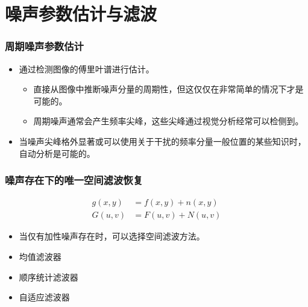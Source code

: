 \documentclass{beamer}
\begin{document}
\section{噪声参数估计与滤波}
\label{sec-4}
\begin{frame}
\frametitle{周期噪声参数估计}
\label{sec-4-1}

\begin{itemize}
\item 通过检测图像的傅里叶谱进行估计。
\begin{itemize}
\item 直接从图像中推断噪声分量的周期性，但这仅仅在非常简单的情况下才是可能的。
\item 周期噪声通常会产生频率尖峰，这些尖峰通过视觉分析经常可以检侧到。
\end{itemize}
\item 当噪声尖峰格外显著或可以使用关于干扰的频率分量一般位置的某些知识时，自动分析是可能的。
\end{itemize}
\end{frame}
\begin{frame}
\frametitle{噪声存在下的唯一空间滤波恢复}
\label{sec-4-2}

\begin{align*}
g(x,y)&=f(x,y)+n(x,y)\\
G(u,v)&=F(u,v)+N(u,v)
\end{align*}

\begin{itemize}
\item 当仅有加性噪声存在时，可以选择空间滤波方法。
\item 均值滤波器
\item 顺序统计滤波器
\item 自适应滤波器
\end{itemize}
\end{frame}
\end{document}
